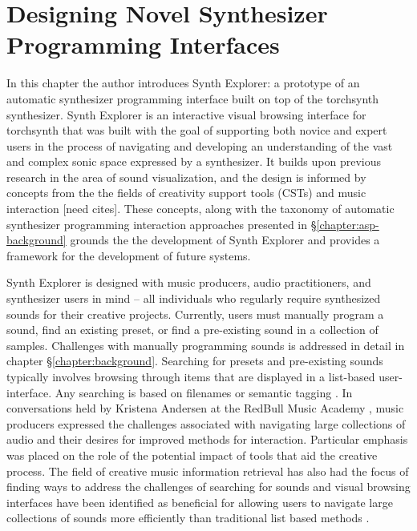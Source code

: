 \graphicspath{{./}{./figures/}{./figures/synthexplore/}}




\chapter{Designing Novel Synthesizer Programming Interfaces}
\label{chapter:synth-explore}

In this chapter the author introduces Synth Explorer: a prototype of an automatic synthesizer programming interface built on top of the torchsynth synthesizer. Synth Explorer is an interactive visual browsing interface for torchsynth that was built with the goal of supporting both novice and expert users in the process of navigating and developing an understanding of the vast and complex sonic space expressed by a synthesizer. It builds upon previous research in the area of sound visualization, and the design is informed by concepts from the the fields of creativity support tools (CSTs) and music interaction [need cites]. These concepts, along with the taxonomy of automatic synthesizer programming interaction approaches presented in \S\ref{chapter:asp-background} grounds the the development of Synth Explorer and provides a framework for the development of future systems. %

Synth Explorer is designed with music producers, audio practitioners, and synthesizer users in mind -- all individuals who regularly require synthesized sounds for their creative projects. Currently, users must manually program a sound, find an existing preset, or find a pre-existing sound in a collection of samples. Challenges with manually programming sounds is addressed in detail in chapter \S\ref{chapter:background}. Searching for presets and pre-existing sounds typically involves browsing through items that are displayed in a list-based user-interface. Any searching is based on filenames or semantic tagging \cite{knees2016searching}. In conversations held by Kristena Andersen at the RedBull Music Academy \cite{andersen2016conversations}, music producers expressed the challenges associated with navigating large collections of audio and their desires for improved methods for interaction. Particular emphasis was placed on the role of the potential impact of tools that aid the creative process. The field of creative music information retrieval has also had the focus of finding ways to address the challenges of searching for sounds \cite{humphrey2013brief} and visual browsing interfaces have been identified as beneficial for allowing users to navigate large collections of sounds more efficiently than traditional list based methods \cite{turquois2016exploring}.

